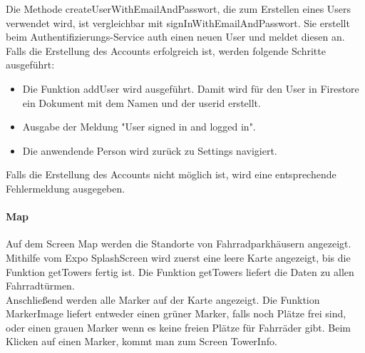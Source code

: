 Die Methode createUserWithEmailAndPasswort, die zum Erstellen eines Users verwendet wird, ist vergleichbar mit signInWithEmailAndPasswort. Sie erstellt beim Authentifizierungs-Service auth einen neuen User und meldet diesen an. Falls die Erstellung des Accounts erfolgreich ist, werden folgende Schritte ausgeführt:
\begin{itemize}
  \item Die Funktion addUser wird ausgeführt. Damit wird für den User in Firestore ein Dokument mit dem Namen und der userid erstellt.
  \item Ausgabe der Meldung "User signed in and logged in".
  \item Die anwendende Person wird zurück zu Settings navigiert.
\end{itemize}
Falls die Erstellung des Accounts nicht möglich ist, wird eine entsprechende Fehlermeldung ausgegeben.\\

\paragraph{Map}Auf dem Screen Map werden die Standorte von Fahrradparkhäusern angezeigt.\\
Mithilfe vom Expo SplashScreen wird zuerst eine leere Karte angezeigt, bis die Funktion getTowers fertig ist. Die Funktion getTowers liefert die Daten zu allen Fahrradtürmen. \\
Anschließend werden alle Marker auf der Karte angezeigt. Die Funktion MarkerImage liefert entweder einen grüner Marker, falls noch Plätze frei sind, oder einen grauen Marker wenn es keine freien Plätze für Fahrräder gibt. Beim Klicken auf einen Marker, kommt man zum Screen TowerInfo.\\

